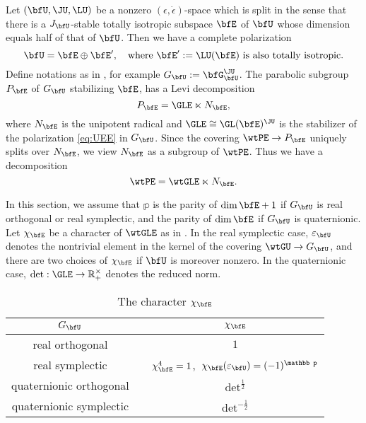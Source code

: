\documentclass[12pt,a4paper]{amsart}
\newcommand{\R}{\mathbb R}
\numberwithin{equation}{section}
\theoremstyle{remark}
\begin{document}
Let $(\bfU,\JU,\LU)$ be a nonzero $(\epsilon, \dot \epsilon)$-space which is
split in the sense that there is a $J_{\bfU}$-stable totally isotropic subspace
$\bfE$ of $\bfU$ whose dimension equals half of that of $\bfU$.
Then we have a
complete polarization
\begin{equation}\label{eq:UEE}
  \bfU=\bfE\oplus \bfE', \quad \textrm{where $\bfE':=\LU(\bfE)$ is also totally isotropic}.
\end{equation}
Define notations as in ,  for example $G_\bfU := \bfG_{\bfU}^{\JU}$.
The parabolic subgroup $P_{\bfE}$ of $G_{\bfU}$
stabilizing $\bfE$, has a Levi decomposition
\[
  P_{\bfE}=\GLE\ltimes N_{\bfE},
\]
where $N_{\bfE}$ is the unipotent radical and $\GLE\cong \GL(\bfE)^{\JU}$
is the stabilizer of  the polarization \eqref{eq:UEE} in $G_\bfU$. Since the covering
$\wtPE\rightarrow P_{\bfE}$ uniquely splits over $N_{\bfE}$, we view $N_{\bfE}$
as a subgroup of $\wtPE$. Thus we have a decomposition
\[
  \wtPE=\wtGLE\ltimes N_{\bfE}.
\]


In this section, we assume that $\mathbb p$ is the parity of $\dim \bfE +1$ if $G_\bfU$ is real orthogonal or real symplectic, and the parity of $\dim \bfE $ if $G_\bfU$ is quaternionic.
Let $\chi_{\bfE}$ be a character of $\wtGLE$ as in \mbox{}.  In
the real symplectic case, $\varepsilon_\bfU$ denotes the nontrivial element in the kernel of the
covering $\wtGU\rightarrow G_\bfU$,  and there are two choices of $\chi_{\bfE}$ if $\bfU$ is moreover nonzero.  In the
quaternionic case, $\det: \GLE\rightarrow \R_+^\times$ denotes the reduced
norm.



\begin{table}[h]
   \centering %
  \begin{tabular}{c c c} %
    $G_{\bfU}$ & \vline & $\chi_{\bfE}$\\ %
    \hline
    real orthogonal & \vline & $1$ \\
    \hline
    real symplectic  & \vline  &
                                 $\chi_{\bfE}^4=1$,$\ $  $\chi_{\bfE}(\varepsilon_{\bfU})=(-1)^{\mathbb p}$ \\
    \hline
    quaternionic orthogonal   & \vline  &
                                          $ \det^{\frac{1}{2}}$\\
    \hline
    quaternionic symplectic   & \vline  &
                                          $ \det^{-\frac{1}{2}}$\\
    \hline
  \end{tabular}\\
\vspace*{.5em}
 \caption{The character  $\chi_{\bfE}$}\label{tablechi}
  \label{table:nonlin} %
\end{table}
\end{document}
